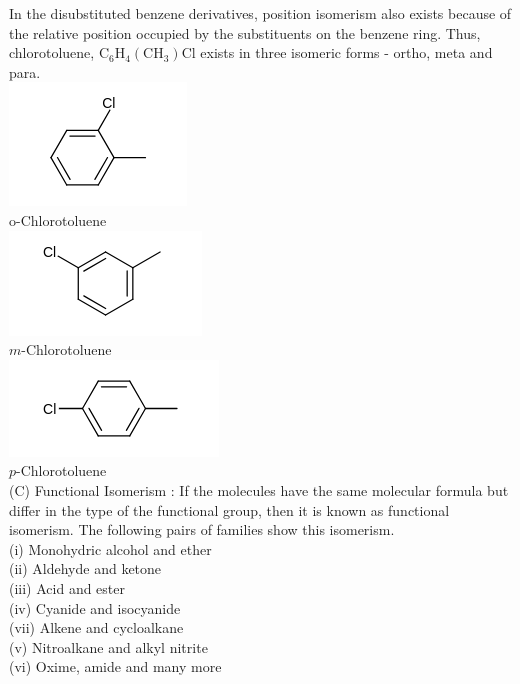 \documentclass[10pt]{article}
\begin{document}
In the disubstituted benzene derivatives, position isomerism also exists because of the relative position occupied by the substituents on the benzene ring. Thus, chlorotoluene, $\mathrm{C}_{6} \mathrm{H}_{4}\left(\mathrm{CH}_{3}\right) \mathrm{Cl}$ exists in three isomeric forms - ortho, meta and para.\\
\includegraphics{smile-031b2cb8b98bc4bedf741283c9bd3f37bed864af}\\
o-Chlorotoluene\\
\includegraphics{smile-469f554eb56565bb198eaf4fb6705d0b7a3bad46}\\
$m$-Chlorotoluene\\
\includegraphics{smile-c9e36342576b87d11800cb3b917d46e025fd041e}\\
$p$-Chlorotoluene\\
(C) Functional Isomerism : If the molecules have the same molecular formula but differ in the type of the functional group, then it is known as functional isomerism. The following pairs of families show this isomerism.\\
(i) Monohydric alcohol and ether\\
(ii) Aldehyde and ketone\\
(iii) Acid and ester\\
(iv) Cyanide and isocyanide\\
(vii) Alkene and cycloalkane\\
(v) Nitroalkane and alkyl nitrite\\
(vi) Oxime, amide and many more
\end{document}
